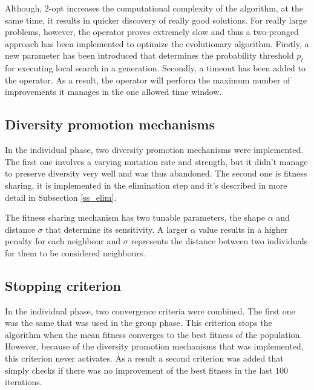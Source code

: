 \documentclass[a4paper,10pt]{article}
\newcommand{\ReplaceMe}[1]{{\color{blue}#1}}
\begin{document}
Although, 2-opt increases the computational complexity of the algorithm, at the same time, it results in quicker discovery of really good solutions. For really large problems, however, the operator proves extremely slow and thus a two-pronged approach has been implemented to optimize the evolutionary algorithm. Firstly, a new parameter has been introduced that determines the probability threshold $p_l$ for executing local search in a generation. Secondly, a timeout has been added to the operator. As a result, the operator will perform the maximum number of improvements it manages in the one allowed time window.


\subsection{Diversity promotion mechanisms} \label{ss:diversity_promotion}


In the individual phase, two diversity promotion mechanisms were implemented. The first one involves a varying mutation rate and strength, but it didn't manage to preserve diversity very well and was thus abandoned. The second one is fitness sharing, it is implemented in the elimination step and it's described in more detail in Subsection \ref{ss_elim}.

The fitness sharing mechanism has two tunable parameters, the shape $\alpha$ and distance $\sigma$ that determine its sensitivity. A larger $\alpha$ value results in a higher penalty for each neighbour and $\sigma$ represents the distance between two individuals for them to be considered neighbours.

\subsection{Stopping criterion} \label{ss:stopping_criterion}


In the individual phase, two convergence criteria were combined. The first one was the same that was used in the group phase. This criterion stops the algorithm when the mean fitness converges to the best fitness of the population. However, because of the diversity promotion mechanisms that was implemented, this criterion never activates. As a result a second criterion was added that simply checks if there was no improvement of the best fitness in the last $100$ iterations.
\end{document}
